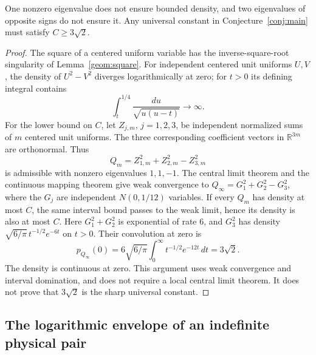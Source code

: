 \begin{proposition}\label{geom:threshold}
One nonzero eigenvalue does not ensure bounded density, and two eigenvalues of opposite signs do not ensure it. Any universal constant in Conjecture~\ref{conj:main} must satisfy $C\ge3\sqrt2$.
\end{proposition}
\begin{proof}
The square of a centered uniform variable has the inverse-square-root singularity of Lemma~\ref{geom:square}. For independent centered unit uniforms $U,V$, the density of $U^2-V^2$ diverges logarithmically at zero; for $t>0$ its defining integral contains
\[
 \int_t^{1/4}\frac{du}{\sqrt{u(u-t)}}\longrightarrow\infty.
\]
For the lower bound on $C$, let $Z_{j,m}$, $j=1,2,3$, be independent normalized sums of $m$ centered unit uniforms. The three corresponding coefficient vectors in $\mathbb R^{3m}$ are orthonormal. Thus
\[
 Q_m=Z_{1,m}^2+Z_{2,m}^2-Z_{3,m}^2
\]
is admissible with nonzero eigenvalues $1,1,-1$. The central limit theorem and the continuous mapping theorem give weak convergence to $Q_\infty=G_1^2+G_2^2-G_3^2$, where the $G_j$ are independent $N(0,1/12)$ variables. If every $Q_m$ has density at most $C$, the same interval bound passes to the weak limit, hence its density is also at most $C$. Here $G_1^2+G_2^2$ is exponential of rate $6$, and $G_3^2$ has density $\sqrt{6/\pi}\,t^{-1/2}e^{-6t}$ on $t>0$. Their convolution at zero is
\[
 p_{Q_\infty}(0)=6\sqrt{6/\pi}\int_0^\infty t^{-1/2}e^{-12t}\,dt=3\sqrt2.
\]
The density is continuous at zero. This argument uses weak convergence and interval domination, and does not require a local central limit theorem. It does not prove that $3\sqrt2$ is the sharp universal constant.
\end{proof}

\subsection{The logarithmic envelope of an indefinite physical pair}

